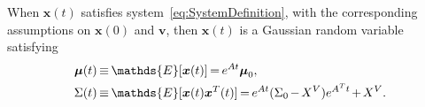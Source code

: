 \documentclass[twocolumn]{autart}
\newcommand{\ve}[1]{{\boldsymbol{#1}}} \newcommand{\tr}{\mbox{tr}} \newcommand{\ex}{\mathds{E}} \newcommand{\va}{\mathds{V}}
\begin{document}
\begin{thm}\label{th:PropertiesOfStateProcess}
When $\ve{x}(t)$ satisfies system~\eqref{eq:SystemDefinition}, with the corresponding assumptions on $\ve{x}(0)$ and $\ve{v}$, then $\ve{x}(t)$ is a Gaussian random variable satisfying
\begin{align}
\ve{\mu}(t) & \hspace{-1pt}\equiv\hspace{-1pt} \ex[\ve{x}(t)] \hspace{-1pt}=\hspace{-1pt} e^{A t} \ve{\mu}_0, \\
\Sigma(t) & \hspace{-1pt}\equiv\hspace{-1pt} \ex[\ve{x}(t) \ve{x}^T(t)] \hspace{-1pt}=\hspace{-1pt} e^{A t} (\Sigma_0 \hspace{-1pt}-\hspace{-1pt} X^V) e^{A^T t} \hspace{-1pt}+\hspace{-1pt} X^V. \label{eq:StateExpectedSquaredValue}
\end{align}
\end{thm}
\end{document}
